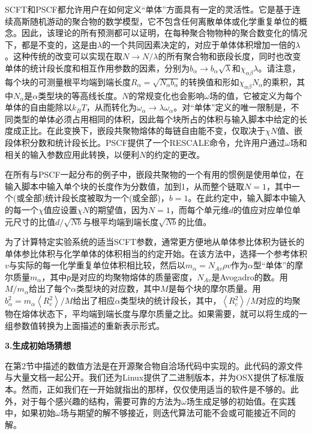 \documentclass[12pt，a4paper]{article}
\numberwithin{equation}{section}
\begin{document}
SCFT和PSCF都允许用户在如何定义“单体”方面具有一定的灵活性。它是基于连续高斯随机游动的聚合物的数学模型，它不包含任何离散单体或化学重复单位的概念。因此，该理论的所有预测都可以证明，在每种聚合物物种的聚合数变化的情况下，都是不变的，这是由$\lambda$的一个共同因素决定的，对应于单体体积增加一倍的$\lambda$。这种传统的改变可以实现在取$N \rightarrow N/ \lambda$的所有聚合物和嵌段长度，同时也改变单体的统计段长度和相互作用参数的因素，分别为$b_{\alpha}\rightarrow b_{\alpha}\sqrt{\lambda}$和$\chi _{\alpha \beta} \lambda$。请注意，每个块的可测量根平均端到端长度$R_{\alpha}=\sqrt{N_{\alpha}b_{\alpha}}$的转换值和形如$\chi _{\alpha \beta} N_{\alpha}$的乘积，其中$N_{\alpha}$是$\alpha$类型块的等高线长度。$N$的常规变化也会影响$\omega$场的值，它被定义为每个单体的自由能除以$k_BT$，从而转化为$\omega _{\alpha} \rightarrow \lambda \omega _{\alpha}$。对“单体”定义的唯一限制是，不同类型的单体必须占用相同的体积，因此每个块所占的体积与输入脚本中给定的长度成正比。在此变换下，嵌段共聚物熔体的每链自由能不变，仅取决于$\chi N$值、嵌段体积分数和统计段长比。PSCF提供了一个RESCALE命令，允许用户通过$\omega$场和相关的输入参数应用此转换，以便利$N$的约定的更改。

在所有与PSCF一起分布的例子中，嵌段共聚物的一个有用的惯例是使用单位，在输入脚本中输入单个块的长度作为分数值，加到1，从而整个链取$N=1$，其中一个(或全部)统计段长度被取为一个(或全部)，$b=1$。在此约定中，输入脚本中输入的每一个$\chi$值应设置$\chi N$的期望值，因为$N=1$，而每个单元维$d$的值应对应单位单元尺寸的比值$d/\sqrt{Nb}$与根平均端到端长度$\sqrt{Nb}$的比值。

为了计算特定实验系统的适当SCFT参数，通常更方便地从单体参比体积为链长的单体参比体积与化学单体的体积相当的约定开始。在该方法中，选择一个参考体积$v$与实际的每一化学重复单位体积相比较，然后以$m_{\alpha}=N_{Av}\rho v$作为$\alpha$型“单体”的摩尔质量$m_{\alpha}$，其中ρ是对应的均聚物熔体的质量密度，$N_{Av}$是Avogadro的数。用$M/m_{\alpha}$给出了每个$\alpha$类型块的对应数，其中$M$是每个块的摩尔质量。用$b_{\alpha}^2=m_{\alpha}\left\langle R_c^2 \right\rangle/M $给出了相应$\alpha$类型块的统计段长，其中，$\left\langle R_c^2 \right\rangle/M$对应的均聚物在熔体状态下，平均端到端长度与摩尔质量之比。如果需要，就可以将生成的一组参数值转换为上面描述的重新表示形式。

\textbf{3.生成初始场猜想}

在第2节中描述的数值方法是在开源聚合物自洽场代码中实现的。此代码的源文件与大量文档一起公开。我们还为Linux提供了二进制版本，并为OSX提供了标准版本。然而，正如我们在一开始就指出的那样，仅仅使用适当的软件是不够的。此外，对于每个感兴趣的结构，需要可靠的方法为$\omega$场生成足够的初始值。在实践中，如果初始$\omega$场与期望的解不够接近，则迭代算法可能不会或可能接近不同的解。
\end{document}
